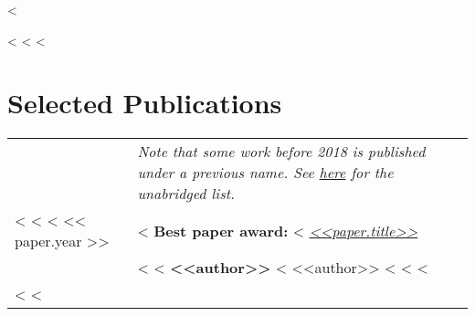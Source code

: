 \documentclass[10pt,letterpaper]{article}
\begin{document}
\thispagestyle{plain}

<%


<%
<%
<%

\section*{Selected Publications}
\begin{longtable}{L!{\VRule}p{16.2cm}}
&{\textit{Note that some work before 2018 is published under a previous name. %
See \href{https://kjwilber.org/publications}{here} for the unabridged list.}}\vspace{10pt}\\
<%
<%
<%
<< paper.year >> &
<%
  \textbf{Best paper award: }
<%
  \href{https://kjwilber.org/static/pdfs/<<paper.pdf>>}{\textit{<<paper.title>>}}\\%
&{\small <%
    <%
      \textbf{<<author>>}
    <%
      <<author>>
    <%
    <%
  <%
}\vspace{5pt}\\
<%
<%
\end{longtable}
\end{document}
